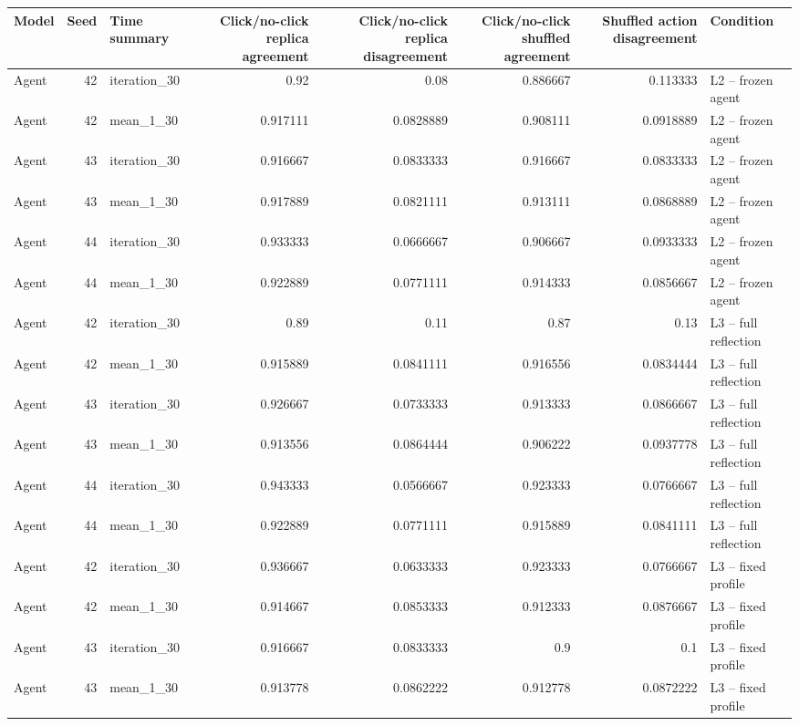 \begin{table}[htbp!]
\centering
\small
\setlength{\tabcolsep}{3pt}
\renewcommand{\arraystretch}{1.1}
\begin{tabular}{lrlrrrrl}
\hline
Model & Seed & Time summary & Click/no-click replica agreement & Click/no-click replica disagreement & Click/no-click shuffled agreement & Shuffled action disagreement & Condition \\
\hline
Agent & 42 & iteration\_30 & 0.92 & 0.08 & 0.886667 & 0.113333 & L2 -- frozen agent \\
Agent & 42 & mean\_1\_30 & 0.917111 & 0.0828889 & 0.908111 & 0.0918889 & L2 -- frozen agent \\
Agent & 43 & iteration\_30 & 0.916667 & 0.0833333 & 0.916667 & 0.0833333 & L2 -- frozen agent \\
Agent & 43 & mean\_1\_30 & 0.917889 & 0.0821111 & 0.913111 & 0.0868889 & L2 -- frozen agent \\
Agent & 44 & iteration\_30 & 0.933333 & 0.0666667 & 0.906667 & 0.0933333 & L2 -- frozen agent \\
Agent & 44 & mean\_1\_30 & 0.922889 & 0.0771111 & 0.914333 & 0.0856667 & L2 -- frozen agent \\
Agent & 42 & iteration\_30 & 0.89 & 0.11 & 0.87 & 0.13 & L3 -- full reflection \\
Agent & 42 & mean\_1\_30 & 0.915889 & 0.0841111 & 0.916556 & 0.0834444 & L3 -- full reflection \\
Agent & 43 & iteration\_30 & 0.926667 & 0.0733333 & 0.913333 & 0.0866667 & L3 -- full reflection \\
Agent & 43 & mean\_1\_30 & 0.913556 & 0.0864444 & 0.906222 & 0.0937778 & L3 -- full reflection \\
Agent & 44 & iteration\_30 & 0.943333 & 0.0566667 & 0.923333 & 0.0766667 & L3 -- full reflection \\
Agent & 44 & mean\_1\_30 & 0.922889 & 0.0771111 & 0.915889 & 0.0841111 & L3 -- full reflection \\
Agent & 42 & iteration\_30 & 0.936667 & 0.0633333 & 0.923333 & 0.0766667 & L3 -- fixed profile \\
Agent & 42 & mean\_1\_30 & 0.914667 & 0.0853333 & 0.912333 & 0.0876667 & L3 -- fixed profile \\
Agent & 43 & iteration\_30 & 0.916667 & 0.0833333 & 0.9 & 0.1 & L3 -- fixed profile \\
Agent & 43 & mean\_1\_30 & 0.913778 & 0.0862222 & 0.912778 & 0.0872222 & L3 -- fixed profile \\

\end{tabular}
\end{table}
